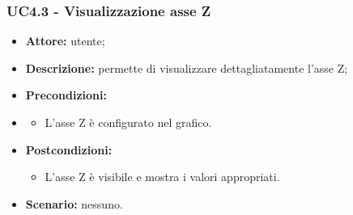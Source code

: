 \subsubsection{UC4.3 - Visualizzazione asse Z}
\begin{itemize}
    \item \textbf{Attore:} utente;
    \item \textbf{Descrizione:} permette di visualizzare dettagliatamente l'asse Z;
    \item \textbf{Precondizioni:} 
    \item \begin{itemize}
        \item L'asse Z è configurato nel grafico.
    \end{itemize}
    \item \textbf{Postcondizioni:} 
    \begin{itemize}
        \item L'asse Z è visibile e mostra i valori appropriati.
    \end{itemize}
    \item \textbf{Scenario:} nessuno.
\end{itemize}
